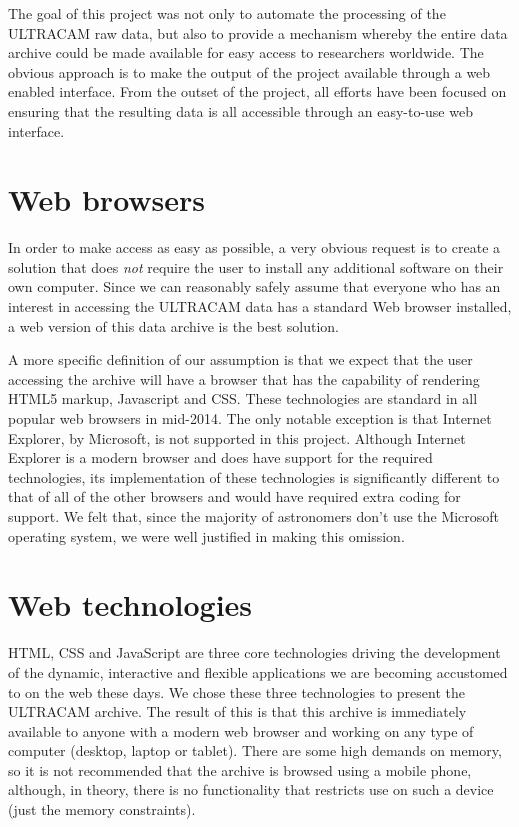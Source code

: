 The goal of this project was not only to automate the processing of the ULTRACAM raw data, but also to provide a mechanism whereby the entire data archive could be made available for easy access to researchers worldwide. The obvious approach is to make the output of the project available through a web enabled interface. From the outset of the project, all efforts have been focused on ensuring that the resulting data is all accessible through an easy-to-use web interface. 

\section{Web browsers}
In order to make access as easy as possible, a very obvious request is to create a solution that does \emph{not} require the user to install any additional software on their own computer. Since we can reasonably safely assume that everyone who has an interest in accessing the ULTRACAM data has a standard Web browser installed, a web version of this data archive is the best solution. 

A more specific definition of our assumption is that we expect that the user accessing the archive will have a browser that has the capability of rendering HTML5 markup, Javascript and CSS. These technologies are standard in all popular web browsers in mid-2014. The only notable exception is that Internet Explorer, by Microsoft, is not supported in this project. Although Internet Explorer is a modern browser and does have support for the required technologies, its implementation of these technologies is significantly different to that of all of the other browsers and would have required extra coding for support. We felt that, since the majority of astronomers don't use the Microsoft operating system, we were well justified in making this omission.  

\section{Web technologies}
HTML, CSS and JavaScript are three core technologies driving the development of the dynamic, interactive and flexible applications we are becoming accustomed to on the web these days. We chose these three technologies to present the ULTRACAM archive. The result of this is that this archive is immediately available to anyone with a modern web browser and working on any type of computer (desktop, laptop or tablet). There are some high demands on memory, so it is not recommended that the archive is browsed using a mobile phone, although, in theory, there is no functionality that restricts use on such a device (just the memory constraints). 

